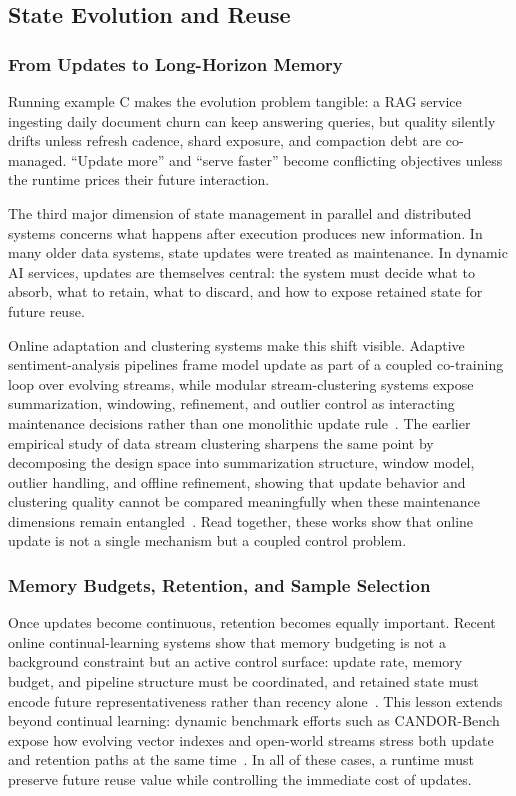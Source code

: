 \documentclass[acmsmall,screen,review]{acmart}
\newcommand{\sysproblem}{state management in parallel and distributed systems\xspace}
\begin{document}
\subsection{State Evolution and Reuse}

\subsubsection{From Updates to Long-Horizon Memory}

Running example C makes the evolution problem tangible: a RAG service ingesting daily document churn can keep answering queries, but quality silently drifts unless refresh cadence, shard exposure, and compaction debt are co-managed. ``Update more'' and ``serve faster'' become conflicting objectives unless the runtime prices their future interaction.

The third major dimension of \sysproblem concerns what happens after execution produces new information. In many older data systems, state updates were treated as maintenance. In dynamic AI services, updates are themselves central: the system must decide what to absorb, what to retain, what to discard, and how to expose retained state for future reuse.

Online adaptation and clustering systems make this shift visible. Adaptive sentiment-analysis pipelines frame model update as part of a coupled co-training loop over evolving streams, while modular stream-clustering systems expose summarization, windowing, refinement, and outlier control as interacting maintenance decisions rather than one monolithic update rule~\cite{wu2023sentistream,wang2024mostream}. The earlier empirical study of data stream clustering sharpens the same point by decomposing the design space into summarization structure, window model, outlier handling, and offline refinement, showing that update behavior and clustering quality cannot be compared meaningfully when these maintenance dimensions remain entangled~\cite{wang2023dscstudy}. Read together, these works show that online update is not a single mechanism but a coupled control problem.

\subsubsection{Memory Budgets, Retention, and Sample Selection}

Once updates become continuous, retention becomes equally important. Recent online continual-learning systems show that memory budgeting is not a background constraint but an active control surface: update rate, memory budget, and pipeline structure must be coordinated, and retained state must encode future representativeness rather than recency alone~\cite{zhou2025ferret,li2026streamfp}. This lesson extends beyond continual learning: dynamic benchmark efforts such as CANDOR-Bench expose how evolving vector indexes and open-world streams stress both update and retention paths at the same time~\cite{wang2026candor}. In all of these cases, a runtime must preserve future reuse value while controlling the immediate cost of updates.
\end{document}
